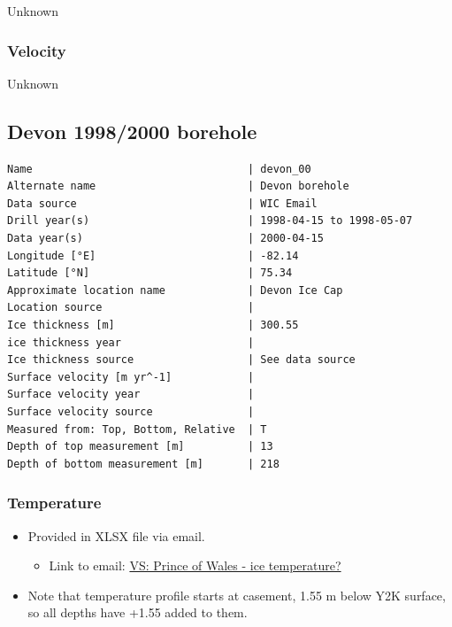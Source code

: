 \documentclass[article,a4paper,times,11pt,twoside]{article}
\begin{document}
Unknown

\subsubsection{Velocity}
\label{sec:org08367c4}

Unknown
\clearpage
\subsection{Devon 1998/2000 borehole}
\label{sec:org22fbce0}
\begin{verbatim}
Name                                  | devon_00
Alternate name                        | Devon borehole
Data source                           | WIC Email
Drill year(s)                         | 1998-04-15 to 1998-05-07
Data year(s)                          | 2000-04-15
Longitude [°E]                        | -82.14
Latitude [°N]                         | 75.34
Approximate location name             | Devon Ice Cap
Location source                       | 
Ice thickness [m]                     | 300.55
ice thickness year                    | 
Ice thickness source                  | See data source
Surface velocity [m yr^-1]            | 
Surface velocity year                 | 
Surface velocity source               | 
Measured from: Top, Bottom, Relative  | T
Depth of top measurement [m]          | 13
Depth of bottom measurement [m]       | 218
\end{verbatim}

\subsubsection{Temperature}
\label{sec:org9e80cfe}

\begin{itemize}
\item Provided in XLSX file via email.
\begin{itemize}
\item Link to email: \href{msgid:AM0PR04MB61295B7BB1FF4BE1112B94ABA2F30@AM0PR04MB6129.eurprd04.prod.outlook.com}{VS: Prince of Wales - ice temperature?}
\end{itemize}
\item Note that temperature profile starts at casement, 1.55 m below Y2K surface, so all depths have +1.55 added to them.
\end{itemize}
\end{document}
